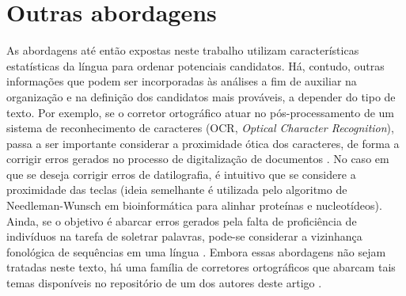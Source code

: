 \documentclass{textolivre}
\begin{document}






\section{Outras abordagens}\label{sec-outros}
As abordagens até então expostas neste trabalho utilizam características estatísticas da língua
para ordenar potenciais candidatos.
Há, contudo, outras informações
que podem ser incorporadas
às análises
a fim de auxiliar 
na organização e na definição dos
candidatos mais prováveis, a depender
do tipo de texto.
Por exemplo, se o corretor ortográfico atuar no pós-processamento
de um sistema de reconhecimento de caracteres (OCR, \textit{Optical Character Recognition}),
passa a ser importante considerar a proximidade ótica dos caracteres, de forma a corrigir erros 
gerados no processo de digitalização de documentos \cite{liu1991,tong1996,nagata1998,taghva2001,jrcacho2012}.
No caso em que se deseja corrigir erros
de datilografia, é intuitivo que se considere a proximidade das teclas
\cite{min1995,samuelsson2017} 
(ideia semelhante é utilizada pelo algoritmo de Needleman-Wunsch em bioinformática para alinhar proteínas
e nucleotídeos).
Ainda, se o objetivo é abarcar erros gerados pela falta de proficiência de indivíduos na tarefa de
soletrar palavras, pode-se considerar a vizinhança fonológica de sequências em uma língua \cite{avanco2014,pilan2018}.
Embora essas abordagens não sejam
tratadas neste texto, há uma família 
de corretores ortográficos que
abarcam tais temas disponíveis no repositório de um dos autores deste
artigo \cite{leolcaspell}.
\end{document}
